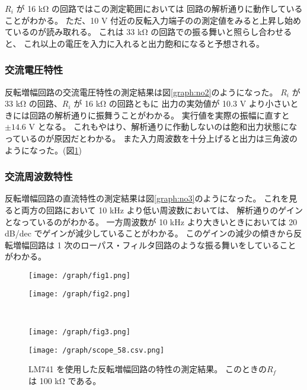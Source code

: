 \documentclass[11pt,dvipdfmx,a4paper]{jsarticle}
\begin{document}
\(R_i\) が 16 k\si{\ohm} の回路ではこの測定範囲においては
回路の解析通りに動作していることがわかる。
ただ、10 V 付近の反転入力端子のの測定値をみると上昇し始めているのが読み取れる。
これは 33 k\si{\ohm} の回路での振る舞いと照らし合わせると、
これ以上の電圧を入力に入れると出力飽和になると予想される。

\subsubsection{交流電圧特性}
反転増幅回路の交流電圧特性の測定結果は図\ref{graph:no2}のようになった。
\(R_i\) が 33 k\si{\ohm} の回路、\(R_i\) が 16 k\si{\ohm} の回路ともに
出力の実効値が 10.3 V より小さいときには回路の解析通りに振舞うことがわかる。
実行値を実際の振幅に直すと\(\pm 14.6\) V となる。
これもやはり、解析通りに作動しないのは飽和出力状態になっているのが原因だとわかる。
また入力周波数を十分上げると出力は三角波のようになった。(図\ref{graph:noA})

\subsubsection{交流周波数特性}
反転増幅回路の直流特性の測定結果は図\ref{graph:no3}のようになった。
これを見ると両方の回路において 10 kHz より低い周波数においては、
解析通りのゲインとなっているのがわかる。
一方周波数が 10 kHz より大きいときにおいては 20 dB/dec でゲインが減少していることがわかる。
このゲインの減少の傾きから反転増幅回路は 1 次のローパス・フィルタ回路のような振る舞いをしていることがわかる。

\begin{figure}[H]
	\centering
	\begin{minipage}[t]{0.49\columnwidth}
		\centering
		\texttt{[image: /graph/fig1.png]}
		\label{graph:no1}
	\end{minipage}
	\hfill
	\begin{minipage}[t]{0.49\columnwidth}
		\centering
		\texttt{[image: /graph/fig2.png]}
		\label{graph:no2}
	\end{minipage}\\
	\begin{minipage}[t]{0.49\columnwidth}
		\centering
		\texttt{[image: /graph/fig3.png]}
		\label{graph:no3}
	\end{minipage}
	\hfill
	\begin{minipage}[t]{0.49\columnwidth}
		\centering
		\texttt{[image: /graph/scope\_58.csv.png]}
		\label{graph:noA}
	\end{minipage}
	\caption{LM741 を使用した反転増幅回路の特性の測定結果。
	このときの\(R_f\) は 100 k\si{\ohm} である。}
\end{figure}
\end{document}
